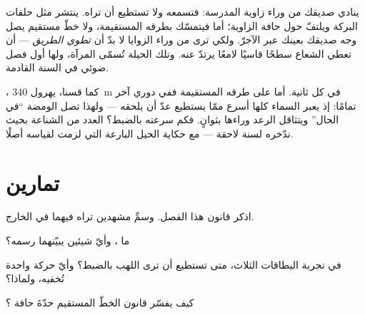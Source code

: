 \begin{example}\label{ex:g4:light-straight-lines:corner}
ينادي صديقك من وراء زاوية المدرسة: فتسمعه ولا تستطيع أن تراه.
 ينتشر مثل حلقات البركة ويلتفّ حول حافة الزاوية؛ أما
 فيتمسّك بطرقه المستقيمة، ولا خطّ مستقيم يصل وجه صديقك
بعينك عبر الآجرّ. ولكي ترى من وراء الزوايا لا بدّ أن \emph{تطوي
الطريق} --- أن تعطي الشعاع سطحًا قاسيًا لامعًا يرتدّ عنه. وتلك
الحيلة تُسمّى المرآة، ولها أول فصل ضوئي في السنة القادمة.
\end{example}

\begin{remark}\label{rem:g4:light-straight-lines:speed}
، كما قسنا، يهرول \qty{340}{m} في كل ثانية. أما  على
طرقه المستقيمة ففي دوري آخر تمامًا: إذ يعبر السماء كلها أسرع
ممّا يستطيع عدّ أن يلحقه --- ولهذا تصل الومضة ``في الحال''
ويتثاقل الرعد وراءها بثوانٍ. فكم سرعته بالضبط؟ العدد من الشناعة
بحيث ندّخره لسنة لاحقة --- مع حكاية الحيل البارعة التي لزمت
لقياسه أصلًا.
\end{remark}

\section{تمارين}

\begin{exercise}[$\star$]\label{exo:g4:light-straight-lines:1}
اذكر قانون هذا الفصل. وسمِّ مشهدين تراه فيهما في الخارج.
\end{exercise}

\begin{exercise}[$\star$]\label{exo:g4:light-straight-lines:2}
ما ، وأيّ شيئين يبيّنهما رسمه؟
\end{exercise}

\begin{exercise}[$\star$]\label{exo:g4:light-straight-lines:3}
في تجربة البطاقات الثلاث، متى تستطيع أن ترى اللهب بالضبط؟ وأيّ
حركة واحدة تُخفيه، ولماذا؟
\end{exercise}

\begin{exercise}[$\star$]\label{exo:g4:light-straight-lines:4}
كيف يفسّر قانون الخطّ المستقيم حدّةَ حافة ؟
\end{exercise}

